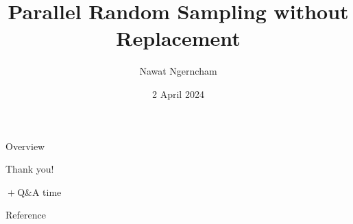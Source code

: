 \documentclass[aspectratio=169]{beamer}
\title{Parallel Random Sampling without Replacement}
\author{Nawat Ngerncham}
\date{2 April 2024}
\begin{document}
\begin{frame}
  \titlepage
\end{frame}

\begin{frame}{Overview}
  \tableofcontents
\end{frame}









\begin{frame}
    \begin{center}
        \Huge{Thank you!}

        \Large{\({}+{}\)Q\&A time}
    \end{center}
\end{frame}

\begin{frame}{Reference}
  
  
\end{frame}
\end{document}
